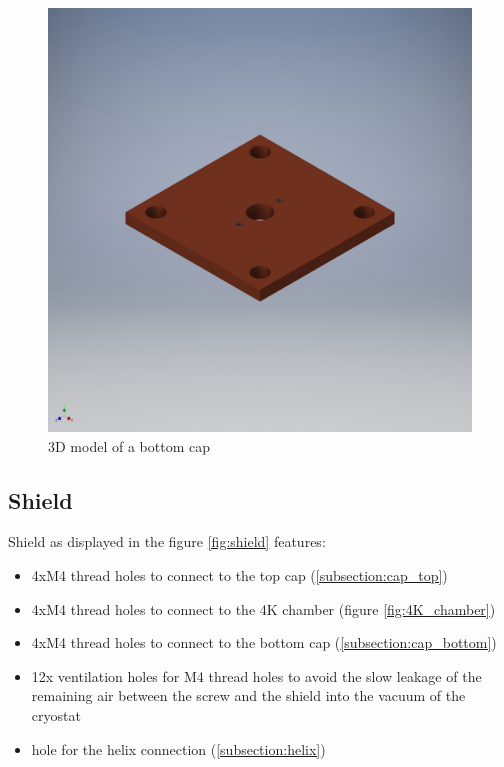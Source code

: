 \begin{figure}[h]
	\centering
	\includegraphics[width=\textwidth]{images/cap_bottom}
	\caption{3D model of a bottom cap}
	\label{fig:cap_bottom}
\end{figure}

\clearpage
\subsection{Shield}
\label{subsection:shield}
Shield as displayed in the figure \ref{fig:shield} features:
\begin{itemize}
	\item 4xM4 thread holes to connect to the top cap (\ref{subsection:cap_top})
	\item 4xM4 thread holes to connect to the 4K chamber (figure \ref{fig:4K_chamber})
	\item 4xM4 thread holes to connect to the bottom cap (\ref{subsection:cap_bottom})
	\item 12x ventilation holes for M4 thread holes to avoid the slow leakage of the remaining air between the screw and the shield into the vacuum of the cryostat	
	\item hole for the helix connection (\ref{subsection:helix})
\end{itemize}

